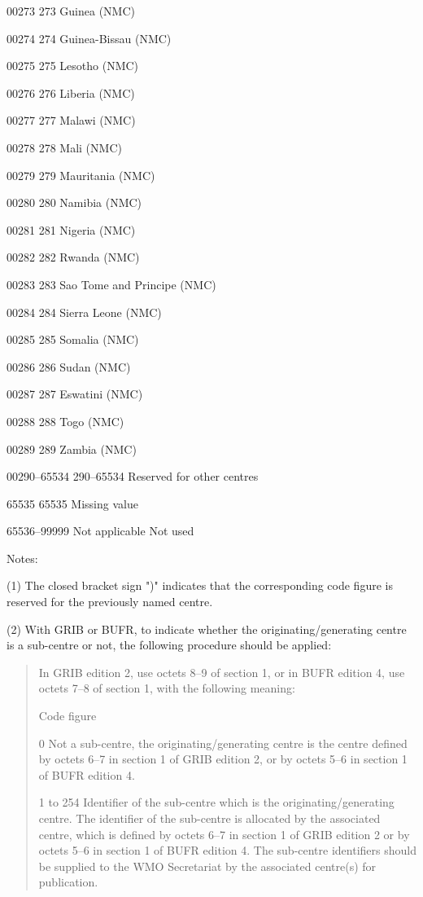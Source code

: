 00273 273 Guinea (NMC)

00274 274 Guinea-Bissau (NMC)

00275 275 Lesotho (NMC)

00276 276 Liberia (NMC)

00277 277 Malawi (NMC)

00278 278 Mali (NMC)

00279 279 Mauritania (NMC)

00280 280 Namibia (NMC)

00281 281 Nigeria (NMC)

00282 282 Rwanda (NMC)

00283 283 Sao Tome and Principe (NMC)

00284 284 Sierra Leone (NMC)

00285 285 Somalia (NMC)

00286 286 Sudan (NMC)

00287 287 Eswatini (NMC)

00288 288 Togo (NMC)

00289 289 Zambia (NMC)

00290--65534 290--65534 Reserved for other centres

65535 65535 Missing value

65536--99999 Not applicable Not used

Notes:

(1) The closed bracket sign ")" indicates that the corresponding code figure is reserved for the previously named centre.

(2) With GRIB or BUFR, to indicate whether the originating/generating centre is a sub-centre or not, the following procedure should be applied:

\begin{quote}
In GRIB edition 2, use octets 8--9 of section 1, or in BUFR edition 4, use octets 7--8 of section 1, with the following meaning:

Code figure

0 Not a sub-centre, the originating/generating centre is the centre defined by octets 6--7 in section 1 of GRIB edition 2, or by octets 5--6 in section 1 of BUFR edition 4.

1 to 254 Identifier of the sub-centre which is the originating/generating centre. The identifier of the sub-centre is allocated by the associated centre, which is defined by octets 6--7 in section 1 of GRIB edition 2 or by octets 5--6 in section 1 of BUFR edition 4. The sub-centre identifiers should be supplied to the WMO Secretariat by the associated centre(s) for publication.
\end{quote}

